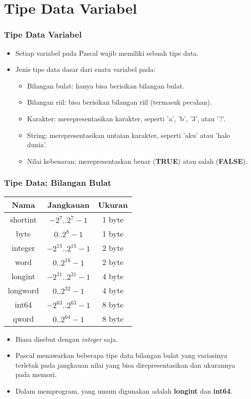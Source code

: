 \section{Tipe Data Variabel}
\frame{\sectionpage}

\begin{frame}
\frametitle{Tipe Data Variabel}
\begin{itemize}
  \item Setiap variabel pada Pascal wajib memiliki sebuah \alert{tipe data}.
  \item Jenis tipe data dasar dari suatu variabel pada:
  \begin{itemize}
    \item Bilangan bulat: hanya bisa berisikan bilangan bulat.
    \item Bilangan riil: bisa berisikan bilangan riil (termasuk pecahan).
    \item Karakter: merepresentasikan karakter, seperti 'a', 'b', '3', atau '?'.
    \item String: merepresentasikan untaian karakter, seperti 'aku' atau 'halo dunia'.
    \item Nilai kebenaran: merepresentaskan benar (\textbf{TRUE}) atau salah (\textbf{FALSE}).
  \end{itemize}
\end{itemize}
\end{frame}

\begin{frame}
\frametitle{Tipe Data: Bilangan Bulat}
\begin{table}[ht]
  \begin{tabular}{|c|c|c|}
    \hline Nama  & Jangkauan  & Ukuran \\
    \hline shortint & $-2^7 .. 2^7-1$ & 1 byte \\
    \hline byte & $0 .. 2^8-1$ & 1 byte\\
    \hline integer & $-2^{15} .. 2^{15}-1$ & 2 byte\\
    \hline word & $0 .. 2^{16}-1$ & 2 byte\\
    \hline longint & $-2^{31} .. 2^{31}-1$ & 4 byte\\
    \hline longword & $0 .. 2^{32}-1$ & 4 byte\\
    \hline int64 & $-2^{63} .. 2^{63}-1$ & 8 byte\\
    \hline qword & $0 .. 2^{64}-1$ & 8 byte\\
    \hline
  \end{tabular}
\end{table}
\begin{itemize}
  \item Biasa disebut dengan \textit{integer} saja.
  \item Pascal menawarkan beberapa tipe data bilangan bulat yang variasinya terletak pada jangkauan nilai yang bisa direpresentasikan dan ukurannya pada memori.
  \item Dalam memprogram, yang umum digunakan adalah \alert{\textbf{longint}} dan \alert{\textbf{int64}}.
\end{itemize}
\end{frame}

